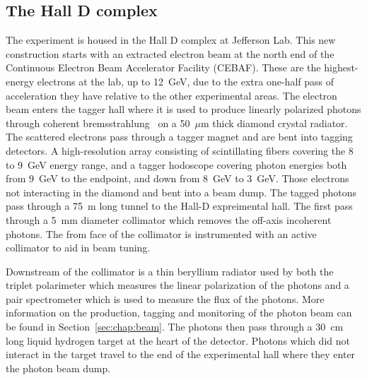 \subsection[The Hall D complex]{The Hall D complex \label{sec:gluexexperiment:complex}}
The \gx{} experiment is housed in the Hall D complex at Jefferson Lab. This new construction starts with an extracted electron beam at the north end of the Continuous Electron Beam Accelerator Facility (CEBAF). These are the highest-energy electrons at the lab, up to 12~GeV, due to the extra one-half pass of acceleration they have relative to the other experimental areas. The electron beam enters the tagger hall where it is used to produce linearly polarized photons through coherent bremsstrahlung~\cite{} on a 50~$\mu$m thick diamond crystal radiator. The scattered electrons pass through a tagger magnet and are bent into tagging detectors. A high-resolution array consisting of scintillating fibers covering the 8 to 9~GeV energy range, and a tagger hodoscope covering photon energies both from 9~GeV to the endpoint, and down from 8~GeV to 3~GeV. Those electrons not interacting in the diamond and bent into a beam dump. The tagged photons pass through a 75~m long tunnel to the Hall-D expreimental hall. The first pass through a 5~mm diameter collimator which removes the off-axis incoherent photons. The from face of the collimator is instrumented with an active collimator to aid in beam tuning. 

Downstream of the collimator is a thin beryllium radiator used by both the triplet polarimeter which measures the linear polarization of the photons and a pair spectrometer which is used to measure the flux of the photons. More information on the production, tagging and monitoring of the photon beam can be found in Section~\ref{sec:chap:beam}. The photons then pass through a 30~cm long liquid hydrogen target at the heart of the \gx{} detector. Photons which did not interact in the target travel to the end of the experimental hall where they enter the photon beam dump.

